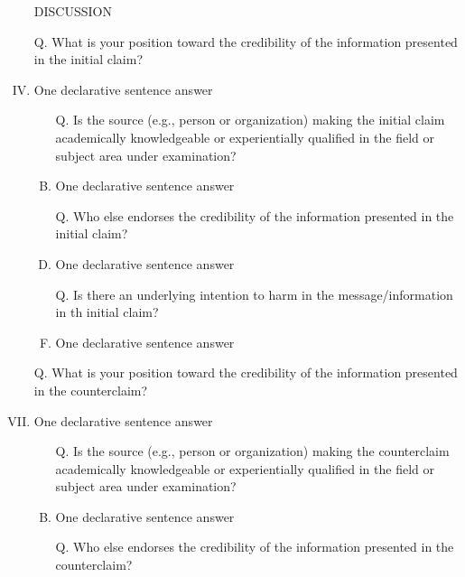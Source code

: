 \documentclass[a4paper, 12pt]{article}
\begin{document}
\begin{CJK*}{UTF8}{bsmi}
\begin{enumerate}[I.]
        \item [] %
        \item [] DISCUSSION
        \item [Q.] What is your position toward the credibility of the information presented in the {\color{blue}initial claim}?
        \item {\color{gray} One declarative sentence answer} %
              \begin{enumerate}[A.]
                  \item [Q.] Is the source (e.g., person or organization) making the {\color{blue}initial claim} academically knowledgeable
                        or experientially qualified in the field or subject area under examination?
                  \item {\color{gray} One declarative sentence answer} %
                  \item [Q.] Who else endorses the credibility of the information presented in the {\color{blue}initial claim}?
                  \item {\color{gray} One declarative sentence answer}
                  \item [Q.] Is there an underlying intention to harm in the message/information in th {\color{blue}initial claim}?
                  \item {\color{gray} One declarative sentence answer}
              \end{enumerate}
        \item []
        \item [Q.] What is your position toward the credibility of the information presented in the {\color{red} counterclaim}?
        \item {\color{gray} One declarative sentence answer} %
              \begin{enumerate}[A.]
                  \item [Q.] Is the source (e.g., person or organization) making the {\color{red}counterclaim} academically knowledgeable
                        or experientially qualified in the field or subject area under examination?
                  \item {\color{gray} One declarative sentence answer} %
                  \item [Q.] Who else endorses the credibility of the information presented in the {\color{red}counterclaim}?

\end{enumerate}
\end{enumerate}
\end{CJK*}
\end{document}
